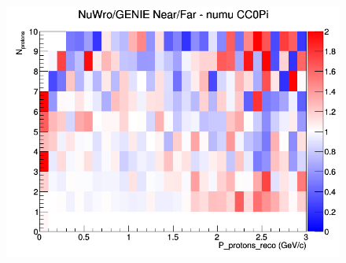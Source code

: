 \documentclass[12pt]{article}
\begin{document}
\begin{figure}[h]
\endminipage
{}
\includegraphics[width=\linewidth]{eff_N_P/LAr/protons/ratios/CC0Pi_NuWro_GENIE_numu_NF_N_P.png}
\endminipage
\newline
\end{figure}
\clearpage
\end{document}
